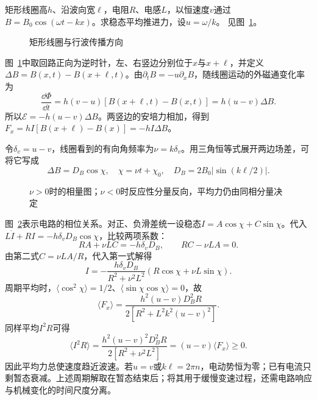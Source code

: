 \begin{exercise}[行波磁场中的电感修正]\label{ex:i3-h3}
矩形线圈高$h$、沿波向宽$\ell$，电阻$R$、电感$L$，以恒速度$v$通过$B=B_0\cos(\omega t-kx)$。求稳态平均推进力，设$u=\omega/k$。 见图~\ref{fig:i3-h3-q}。
\end{exercise}

\begin{figure}[H]\centering
{}
\caption{矩形线圈与行波传播方向}\label{fig:i3-h3-q}
\end{figure}
\begin{solution}
图~\ref{fig:i3-h3-q}中取回路正向为逆时针，左、右竖边分别位于$x$与$x+\ell$，并定义$\Delta B=B(x,t)-B(x+\ell,t)$。由$\partial_tB=-u\partial_xB$，随线圈运动的外磁通变化率为
\[
\frac{\dd\Phi}{\dd t}
=h(v-u)[B(x+\ell,t)-B(x,t)]
=h(u-v)\Delta B.
\]
所以$\mathcal E=-h(u-v)\Delta B$。两竖边的安培力相加，得到$F_x=hI[B(x+\ell)-B(x)]=-hI\Delta B$。

令$\delta_v=u-v$，线圈看到的有向角频率为$\nu=k\delta_v$。用三角恒等式展开两边场差，可将它写成
\[
\Delta B=D_B\cos\chi,\quad
\chi=\nu t+\chi_0,\quad D_B=2B_0|\sin(k\ell/2)|.
\]
\begin{figure}[H]\centering
{}
\caption{$\nu>0$时的相量图；$\nu<0$时反应性分量反向，平均力仍由同相分量决定}\label{fig:i3-h3-s}
\end{figure}
图~\ref{fig:i3-h3-s}表示电路的相位关系。对正、负滑差统一设稳态$I=A\cos\chi+C\sin\chi$。代入$L\dot I+RI=-h\delta_vD_B\cos\chi$，比较两项系数：
\[
RA+\nu LC=-h\delta_vD_B,\qquad RC-\nu LA=0.
\]
由第二式$C=\nu LA/R$，代入第一式解得
\[
I=-\frac{h\delta_vD_B}{R^2+\nu^2L^2}
(R\cos\chi+\nu L\sin\chi).
\]
周期平均时，$\langle\cos^2\chi\rangle=1/2$、$\langle\sin\chi\cos\chi\rangle=0$，故
\[
\boxed{\langle F_x\rangle
=\frac{h^2(u-v)D_B^2R}{2[R^2+L^2k^2(u-v)^2]}}.
\]
同样平均$I^2R$可得
\[
\langle I^2R\rangle
=\frac{h^2(u-v)^2D_B^2R}{2[R^2+\nu^2L^2]}
=(u-v)\langle F_x\rangle\ge0.
\]
因此平均力总使速度趋近波速。若$u=v$或$k\ell=2\pi n$，电动势恒为零；已有电流只剩暂态衰减。上述周期解取在暂态结束后；将其用于缓慢变速过程，还需电路响应与机械变化的时间尺度分离。
\end{solution}


